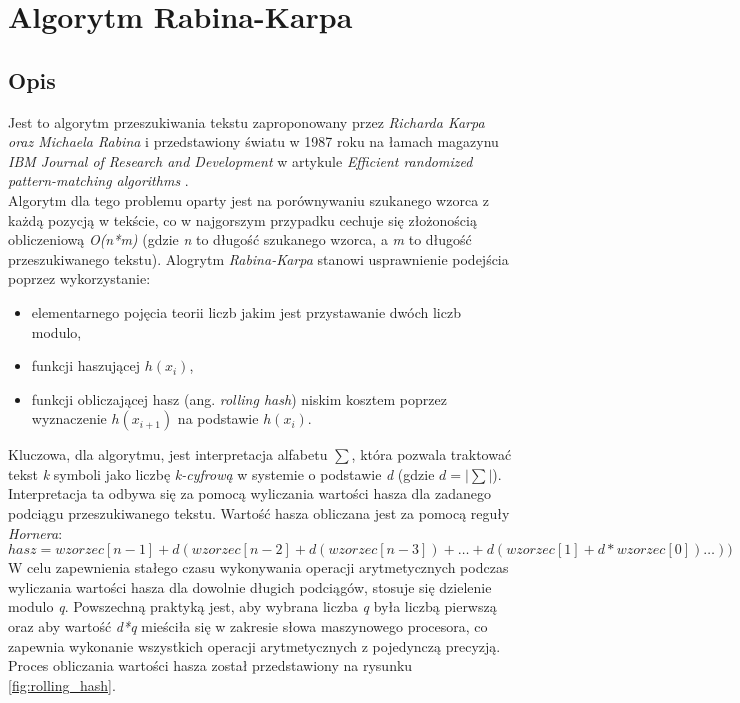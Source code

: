 \section{Algorytm Rabina-Karpa}
\subsection{Opis}
Jest to algorytm przeszukiwania tekstu zaproponowany przez \textit{Richarda Karpa oraz Michaela Rabina} i przedstawiony światu w 1987 roku na łamach magazynu \textit{IBM Journal of Research and Development} w artykule \textit{Efficient randomized pattern-matching algorithms} \cite{rabin_karp_alg}.\\
Algorytm  dla tego problemu oparty jest na porównywaniu szukanego wzorca z każdą pozycją w tekście, co w najgorszym przypadku cechuje się złożonością obliczeniową \textit{O(n*m)} (gdzie \textit{n} to długość szukanego wzorca, a \textit{m} to długość przeszukiwanego tekstu).
Alogrytm \textit{Rabina-Karpa} stanowi usprawnienie  podejścia poprzez wykorzystanie:
\begin{itemize}
    \item elementarnego pojęcia teorii liczb jakim jest przystawanie dwóch liczb modulo,
    \item funkcji haszującej \textit{$h(x_{i})$},
    \item funkcji obliczającej  hasz (ang. \textit{rolling hash}) niskim kosztem  poprzez wyznaczenie \textit{$h(x_{i+1})$} na podstawie \textit{$h(x_{i})$}.
\end{itemize}
Kluczowa, dla algorytmu, jest interpretacja alfabetu $\sum$, która pozwala traktować tekst \textit{k} symboli jako liczbę \textit{k-cyfrową} w systemie o podstawie \textit{d} (gdzie \textit{$d = |\sum|$}). Interpretacja ta odbywa się za pomocą wyliczania wartości hasza dla zadanego podciągu przeszukiwanego tekstu. Wartość hasza obliczana jest za pomocą reguły \textit{Hornera}:
\[ hasz = wzorzec[n-1] + d(wzorzec[n-2] + d(wzorzec[n-3]) + \ldots + d(wzorzec[1] + d*wzorzec[0]) \ldots ))\]
W celu zapewnienia stałego czasu wykonywania operacji arytmetycznych podczas wyliczania wartości hasza dla dowolnie długich podciągów, stosuje się dzielenie modulo \textit{q}. Powszechną praktyką jest, aby wybrana liczba \textit{q} była liczbą pierwszą oraz aby wartość \textit{d*q} mieściła się w zakresie słowa maszynowego procesora, co zapewnia wykonanie wszystkich operacji arytmetycznych z pojedynczą precyzją.
Proces obliczania wartości  hasza został przedstawiony na rysunku \ref{fig:rolling_hash}.
